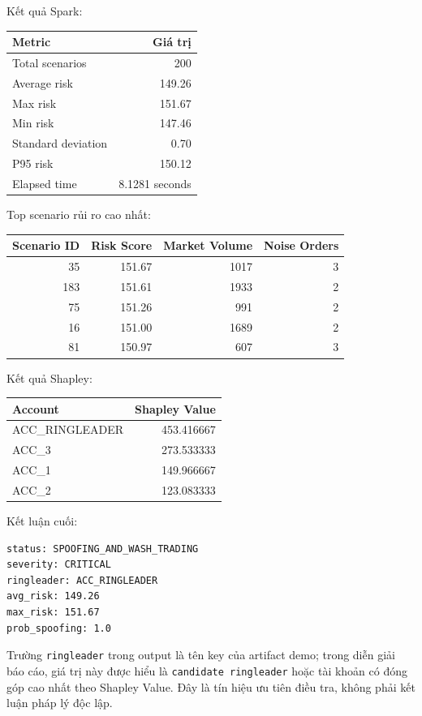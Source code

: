 \documentclass[12pt,a4paper]{report}
\begin{document}
Kết quả Spark:

\begin{longtable}{lr}
\toprule
\textbf{Metric} & \textbf{Giá trị} \\
\midrule
Total scenarios & 200 \\
Average risk & 149.26 \\
Max risk & 151.67 \\
Min risk & 147.46 \\
Standard deviation & 0.70 \\
P95 risk & 150.12 \\
Elapsed time & 8.1281 seconds \\
\bottomrule
\end{longtable}

Top scenario rủi ro cao nhất:

\begin{longtable}{rrrr}
\toprule
\textbf{Scenario ID} & \textbf{Risk Score} & \textbf{Market Volume} & \textbf{Noise Orders} \\
\midrule
35 & 151.67 & 1017 & 3 \\
183 & 151.61 & 1933 & 2 \\
75 & 151.26 & 991 & 2 \\
16 & 151.00 & 1689 & 2 \\
81 & 150.97 & 607 & 3 \\
\bottomrule
\end{longtable}

Kết quả Shapley:

\begin{longtable}{lr}
\toprule
\textbf{Account} & \textbf{Shapley Value} \\
\midrule
ACC\_RINGLEADER & 453.416667 \\
ACC\_3 & 273.533333 \\
ACC\_1 & 149.966667 \\
ACC\_2 & 123.083333 \\
\bottomrule
\end{longtable}

Kết luận cuối:

\begin{lstlisting}
status: SPOOFING_AND_WASH_TRADING
severity: CRITICAL
ringleader: ACC_RINGLEADER
avg_risk: 149.26
max_risk: 151.67
prob_spoofing: 1.0
\end{lstlisting}

Trường \texttt{ringleader} trong output là tên key của artifact demo; trong diễn giải báo cáo, giá trị này được hiểu là \texttt{candidate ringleader} hoặc tài khoản có đóng góp cao nhất theo Shapley Value. Đây là tín hiệu ưu tiên điều tra, không phải kết luận pháp lý độc lập.
\end{document}
